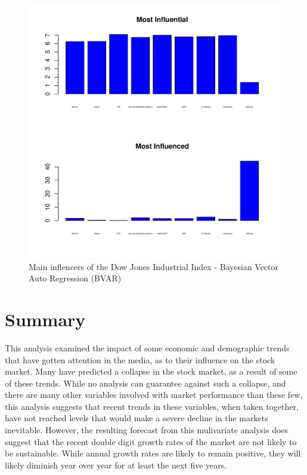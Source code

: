 \documentclass[12pt]{article}         %
\begin{document}
\begin{figure}[h!]
\begin{center}
\includegraphics[width=\linewidth]{plots/DJIChg_barchart_not_whitened.pdf}
\caption{Main inflencers of the Dow Jones Industrial Index - Bayesian Vector Auto Regression (BVAR)}
\label{fig:BVARInfluencers}
\end{center}
\end{figure}

\section{Summary}

This analysis examined the impact of some economic and demographic trends that have gotten attention in the media, as to their influence on the stock market.  Many have predicted a collapse in the stock market, as a result of some of these trends.  While no analysis can guarantee against such a collapse, and there are many other variables involved with market performance than these few, this analysis suggests that recent trends in these variables, when taken together, have not reached levels that would make a severe decline in the markets inevitable.  However, the resulting forecast from this mulivariate analysis does suggest that the recent double digit growth rates of the market are not likely to be sustainable.  While annual growth rates are likely to remain positive, they will likely diminish year over year for at least the next five years.
\end{document}
